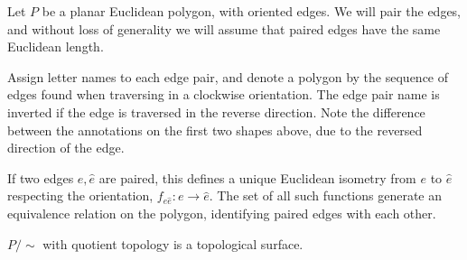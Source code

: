 \documentclass[a4paper,11pt]{article}
\begin{document}
\begin{example}
	Let \( P \) be a planar Euclidean polygon, with oriented edges.
	We will pair the edges, and without loss of generality we will assume that paired edges have the same Euclidean length.
	\begin{center}
	\end{center}
	Assign letter names to each edge pair, and denote a polygon by the sequence of edges found when traversing in a clockwise orientation.
	The edge pair name is inverted if the edge is traversed in the reverse direction.
	Note the difference between the annotations on the first two shapes above, due to the reversed direction of the edge.

	If two edges \( e, \hat e \) are paired, this defines a unique Euclidean isometry from \( e \) to \( \hat e \) respecting the orientation, \( f_{e\hat e} \colon e \to \hat e \).
	The set of all such functions generate an equivalence relation on the polygon, identifying paired edges with each other.
	\begin{lemma}
		$P/\sim $ with quotient topology is a topological surface. 
	\end{lemma}
\end{example}
\end{document}
